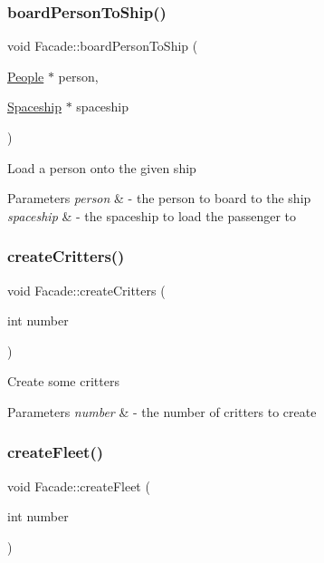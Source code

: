 \subsubsection{\texorpdfstring{board\+Person\+To\+Ship()}{boardPersonToShip()}}
{\footnotesize\ttfamily void Facade\+::board\+Person\+To\+Ship (\begin{DoxyParamCaption}\item[{\hyperlink{classPeople}{People} $\ast$}]{person,  }\item[{\hyperlink{classSpaceship}{Spaceship} $\ast$}]{spaceship }\end{DoxyParamCaption})}

Load a person onto the given ship 
\begin{DoxyParams}{Parameters}
{\em person} & -\/ the person to board to the ship \\
\hline
{\em spaceship} & -\/ the spaceship to load the passenger to \\
\hline
\end{DoxyParams}
\mbox{\label{classFacade_a2947cf249289176c61d53412f30eac14}} 
\subsubsection{\texorpdfstring{create\+Critters()}{createCritters()}}
{\footnotesize\ttfamily void Facade\+::create\+Critters (\begin{DoxyParamCaption}\item[{int}]{number }\end{DoxyParamCaption})}

Create some critters 
\begin{DoxyParams}{Parameters}
{\em number} & -\/ the number of critters to create \\
\hline
\end{DoxyParams}
\mbox{\label{classFacade_a1bac00087158eb5c52c31d38d3b0c5dd}} 
\subsubsection{\texorpdfstring{create\+Fleet()}{createFleet()}}
{\footnotesize\ttfamily void Facade\+::create\+Fleet (\begin{DoxyParamCaption}\item[{int}]{number }\end{DoxyParamCaption})}

